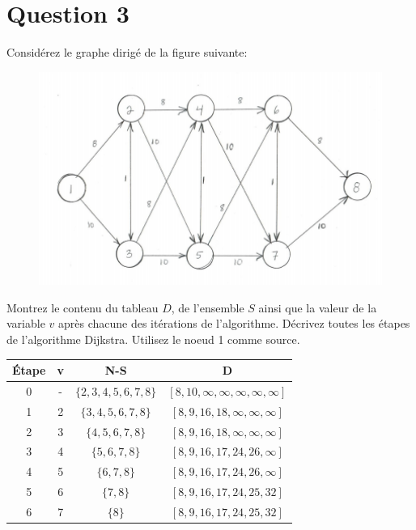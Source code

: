\documentclass[12pt]{article}
\begin{document}
\section*{Question 3}
Considérez le graphe dirigé de la figure suivante:

\begin{figure}[H]
	\centering
	\includegraphics[width=12cm]{q3}
\end{figure}

Montrez le contenu du tableau \(D\), de l’ensemble \(S\) ainsi que la valeur de la variable \(v\) après chacune des itérations de l’algorithme. Décrivez toutes les étapes de l’algorithme Dijkstra. Utilisez le noeud 1 comme source. \\

\begin{table}[H]
\centering
\begin{tabular}{c|ccc}
Étape     & v & N-S                                  & D \\ \hline
    0     & - &  \(\lbrace 2,3,4,5,6,7,8 \rbrace\)   & \([8,10,\infty,\infty,\infty,\infty,\infty]\)  \\
    1     & 2 &  \(\lbrace 3,4,5,6,7,8 \rbrace\)     & \([8,9,16,18,\infty,\infty,\infty]\)  \\
    2     & 3 &  \(\lbrace 4,5,6,7,8 \rbrace\)       & \([8,9,16,18,\infty,\infty,\infty]\)  \\ 
    3     & 4 &  \(\lbrace 5,6,7,8 \rbrace\)         & \([8,9,16,17,24,26,\infty]\)  \\
    4     & 5 &  \(\lbrace 6,7,8 \rbrace\)           & \([8,9,16,17,24,26,\infty]\)  \\
    5     & 6 &  \(\lbrace 7,8 \rbrace\)   		     & \([8,9,16,17,24,25,32]\)  \\
    6     & 7 &  \(\lbrace 8 \rbrace\)   			 & \([8,9,16,17,24,25,32]\)  \\
\end{tabular}
\end{table}
\end{document}
